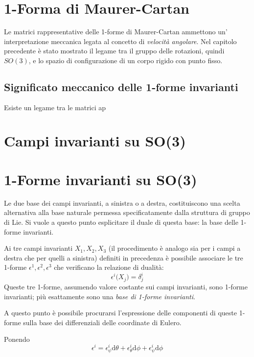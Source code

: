 \documentclass[11pt]{report}
\theoremstyle{plain}
\theoremstyle{definition}
\theoremstyle{remark}
\begin{document}
\section{1-Forma di Maurer-Cartan}
Le matrici rappresentative delle 1-forme di Maurer-Cartan ammettono un' interpretazione meccanica legata al concetto di \emph{velocità angolare}.
Nel capitolo precedente è stato mostrato il legame tra il gruppo delle rotazioni, quindi $SO(3)$, e lo spazio di configurazione di un corpo rigido con punto fisso.

\subsection{Significato meccanico delle 1-forme invarianti}
Esiste un legame tra le matrici ap

\section{Campi invarianti su SO(3)}


\section{1-Forme invarianti su SO(3)}
Le due base dei campi invarianti, a sinistra o a destra,  costituiscono una scelta alternativa alla base naturale permessa specificatamente dalla struttura di gruppo di Lie.
Si vuole a questo punto esplicitare il duale di questa base: la base delle 1-forme invarianti.

Ai tre campi invarianti $ X_{1}, X_{2}, X_{3}$ (il procedimento è analogo sia per i campi a destra che per quelli a sinistra) definiti in precedenza è possibile associare le tre 1-forme $\epsilon^{1}, \epsilon^{2}, \epsilon^{3}$ che verificano la relazione di dualità:
\begin{equation}
\epsilon^{i} \bigr( X_{j} \bigr) = \delta^{i}_{j}
\end{equation}
Queste tre 1-forme, assumendo valore costante sui campi invarianti, sono 1-forme invarianti; più esattamente sono una \emph{base di 1-forme invarianti}.

A questo punto è possibile procurarsi l'espressione delle componenti di queste 1-forme sulla base dei differenziali delle coordinate di Eulero.

Ponendo
\begin{displaymath}
\epsilon^{i} = \epsilon^{i} _{\psi} \textrm{d}\theta +\epsilon^{i} _{\theta} \textrm{d}\phi +\epsilon^{i} _{\psi} \textrm{d}\phi
\end{displaymath}
\end{document}
